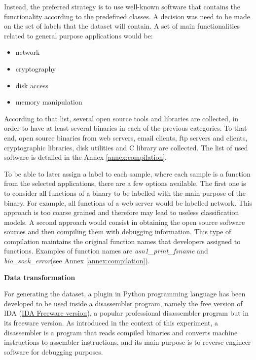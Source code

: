Instead, the preferred strategy is to use well-known software that contains the functionality according to the predefined classes. A decision was need to be made on the set of labels that the dataset will contain. A set of main functionalities related to general purpose applications would be:
\begin{itemize}
	\item network
	\item cryptography
	\item disk access
	\item memory manipulation
\end{itemize}
According to that list, several open source tools and libraries are collected, in order to have at least several binaries in each of the previous categories. To that end, open source binaries from web servers, email clients, ftp servers and clients, cryptographic libraries, disk utilities and C library are collected. The list of used software is detailed in the Annex \ref{annex:compilation}.

To be able to later assign a label to each sample, where each sample is a function from the selected applications, there are a few options available. The first one is to consider all functions of a binary to be labelled with the main purpose of the binary. For example, all functions of a web server would be labelled network. This approach is too coarse grained and therefore may lead to useless classification models. A second approach would consist in obtaining the open source software sources and then compiling them with debugging information. This type of compilation maintains the original function names that developers assigned to functions. Examples of function names are \textit{asn1\_print\_fsname} and \textit{bio\_sock\_error}(see Annex \ref{annex:compilation}).



\textbf{Data transformation}

For generating the dataset, a plugin in Python programming language has been developed to be used inside a disassembler program, namely the free version of IDA (\href{https://www.hex-rays.com/products/ida/support/download\_freeware.shtml}{IDA Freeware version}), a popular professional disassembler program but in its freeware version. As introduced in the context of this experiment, a disassembler is a program that reads compiled binaries and converts machine instructions to assembler instructions, and its main purpose is to reverse engineer software for debugging purposes.


